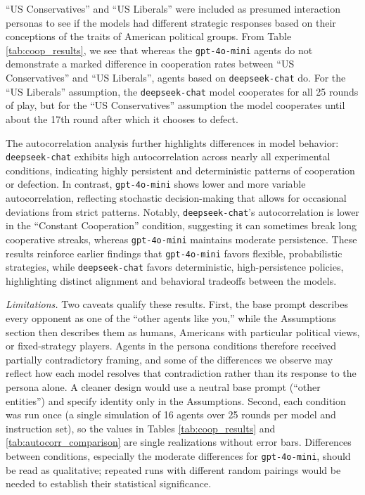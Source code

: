 \documentclass[%
 reprint,
 amsmath,amssymb,
 aps,
]{revtex4-2}
\begin{document}
``US Conservatives'' and ``US Liberals'' were included as presumed interaction personas to see if the models had different strategic responses based on their conceptions of the traits of American political groups. From Table \ref{tab:coop_results}, we see that whereas the \texttt{gpt-4o-mini} agents do not demonstrate a marked difference in cooperation rates between ``US Conservatives'' and ``US Liberals'', agents based on \texttt{deepseek-chat} do. For the ``US Liberals'' assumption, the \texttt{deepseek-chat} model cooperates for all 25 rounds of play, but for the ``US Conservatives'' assumption the model cooperates until about the 17th round after which it chooses to defect. 

The autocorrelation analysis further highlights differences in model behavior: \texttt{deepseek-chat} exhibits high autocorrelation across nearly all experimental conditions, indicating highly persistent and deterministic patterns of cooperation or defection. In contrast, \texttt{gpt-4o-mini} shows lower and more variable autocorrelation, reflecting stochastic decision-making that allows for occasional deviations from strict patterns. Notably, \texttt{deepseek-chat}'s autocorrelation is lower in the ``Constant Cooperation'' condition, suggesting it can sometimes break long cooperative streaks, whereas \texttt{gpt-4o-mini} maintains moderate persistence. These results reinforce earlier findings that \texttt{gpt-4o-mini} favors flexible, probabilistic strategies, while \texttt{deepseek-chat} favors deterministic, high-persistence policies, highlighting distinct alignment and behavioral tradeoffs between the models.

\textit{Limitations.} Two caveats qualify these results. First, the base prompt describes every opponent as one of the ``other agents like you,'' while the Assumptions section then describes them as humans, Americans with particular political views, or fixed-strategy players. Agents in the persona conditions therefore received partially contradictory framing, and some of the differences we observe may reflect how each model resolves that contradiction rather than its response to the persona alone. A cleaner design would use a neutral base prompt (``other entities'') and specify identity only in the Assumptions. Second, each condition was run once (a single simulation of 16 agents over 25 rounds per model and instruction set), so the values in Tables \ref{tab:coop_results} and \ref{tab:autocorr_comparison} are single realizations without error bars. Differences between conditions, especially the moderate differences for \texttt{gpt-4o-mini}, should be read as qualitative; repeated runs with different random pairings would be needed to establish their statistical significance.
\end{document}
